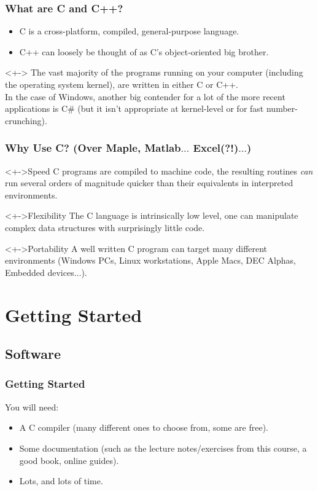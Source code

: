 \documentclass[smaller,handout,table]{beamer}
\begin{document}
\begin{frame}
\frametitle{What are C and C++?}
\begin{itemize}
\item C is a cross-platform, compiled, general-purpose language.
\item C++ can loosely be thought of as C's object-oriented big brother.
\end{itemize}
\begin{alertblock}<+->{}
The vast majority of the programs running on your computer (including the operating system kernel), are written in either C or C++.\\
In the case of Windows, another big contender for a lot of the more recent applications is C\# (but it isn't appropriate at kernel-level or for fast number-crunching).
\end{alertblock}
\end{frame}


\begin{frame}
\frametitle{Why Use C? (Over Maple, Matlab$\ldots$ Excel(?!)$\ldots$)}
\begin{block}<+->{Speed}
C programs are compiled to machine code, the resulting routines \emph{can} run several orders of magnitude quicker than their equivalents in interpreted environments.
\end{block}

\begin{block}<+->{Flexibility}
The C language is intrinsically low level, one can manipulate complex data structures with surprisingly little code.
\end{block}

\begin{block}<+->{Portability}
A well written C program can target many different environments (Windows PCs, Linux workstations, Apple Macs, DEC Alphas, Embedded devices$\ldots$).
\end{block}
\end{frame}

\section{Getting Started}
\subsection{Software}
\begin{frame}
\frametitle{Getting Started}
You will need:
\begin{itemize}
\item A C compiler (many different ones to choose from, some are free).
\item Some documentation (such as the lecture notes/exercises from this course,
a good book, online guides).
\item Lots, and lots of time.
\end{itemize}
\end{frame}
\end{document}
